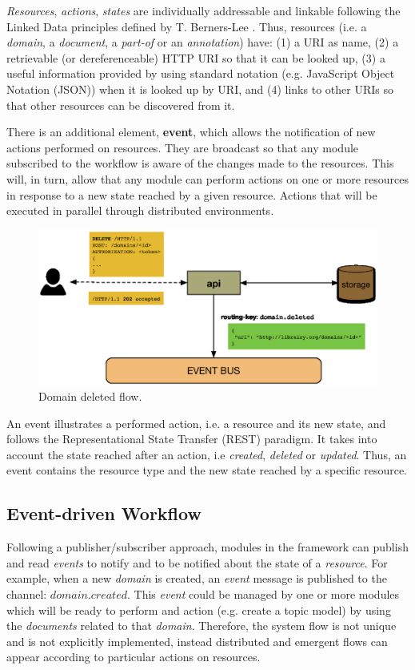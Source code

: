 \textit{Resources}, \textit{actions}, \textit{states} are individually addressable and linkable \cite{Turchi2012a} following the Linked Data principles defined by T. Berners-Lee \cite{Bizer2009}. Thus, resources (i.e. a \textit{domain}, a \textit{document}, a \textit{part-of} or an \textit{annotation}) have:
(1) a URI as name, (2) a retrievable (or dereferenceable) HTTP URI so that it can be looked up, (3) a useful information provided by using standard notation (e.g. JavaScript Object Notation (JSON)) when it is  looked up by URI, and (4) links to other URIs so that other resources can be discovered from it.


There is an additional element, \textbf{event}, which allows the notification of new actions performed on resources. They are broadcast so that any module subscribed to the workflow is aware of the changes made to the resources. This will, in turn, allow that any module can perform actions on one or more resources in response to a new state reached by a given resource. Actions that will be executed in parallel through distributed environments.

\begin{figure}
  \includegraphics[scale=0.35]{api-domain-deleted}
  \caption{Domain deleted flow.}
  \label{fig:librairy-domain-deleted}
\end{figure}

An event illustrates a performed action, i.e. a resource and its new state, and follows the Representational State Transfer (REST)\cite{Fielding2002} paradigm. It takes into account the state reached after an action, i.e \textit{created}, \textit{deleted} or \textit{updated}. Thus, an event contains the resource type and the new state reached by a specific resource.


\subsection{Event-driven Workflow}
Following a publisher/subscriber approach, modules in the framework can publish and read \textit{events} to notify and to be notified about the state of a \textit{resource}. For example, when a new \textit{domain} is created, an \textit{event} message is published to the channel: $domain.created$. This \textit{event} could be managed by one or more modules which will be ready to perform and action (e.g. create a topic model) by using the \textit{documents} related to that \textit{domain}. 
Therefore, the system flow is not unique and is not explicitly implemented, instead distributed and emergent flows can appear according to particular actions on resources.

